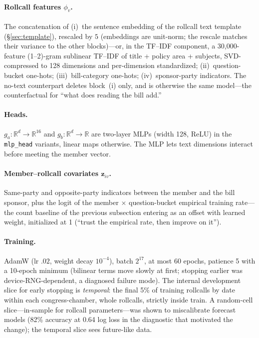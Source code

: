 \documentclass[11pt]{article}
\newcommand{\code}[1]{\texttt{#1}}
\begin{document}
\paragraph{Rollcall features $\phi_v$.} The concatenation of
(i)~the sentence embedding of the rollcall text template
(\S\ref{sec:template}), rescaled by $5$ (embeddings are unit-norm; the
rescale matches their variance to the other blocks)---or, in the
TF--IDF component, a 30{,}000-feature (1--2)-gram sublinear TF--IDF of
title + policy area + subjects, SVD-compressed to 128 dimensions and
per-dimension standardized; (ii)~question-bucket one-hots;
(iii)~bill-category one-hots; (iv)~sponsor-party indicators. The
no-text counterpart deletes block~(i) only, and is otherwise the same
model---the counterfactual for ``what does reading the bill add.''

\paragraph{Heads.} $g_a: \mathbb{R}^d \to \mathbb{R}^{16}$ and
$g_b: \mathbb{R}^d \to \mathbb{R}$ are two-layer MLPs (width 128, ReLU)
in the \code{mlp\_head} variants, linear maps otherwise. The MLP lets
text dimensions interact before meeting the member vector.

\paragraph{Member--rollcall covariates $\mathbf{z}_{iv}$.} Same-party
and opposite-party indicators between the member and the bill sponsor,
plus the logit of the member $\times$ question-bucket empirical
training rate---the count baseline of the previous subsection entering
as an offset with learned weight, initialized at 1 (``trust the
empirical rate, then improve on it'').

\paragraph{Training.} AdamW (lr $.02$, weight decay $10^{-4}$), batch
$2^{17}$, at most 60 epochs, patience 5 with a 10-epoch minimum
(bilinear terms move slowly at first; stopping earlier was
device-RNG-dependent, a diagnosed failure mode). The internal
development slice for early stopping is \emph{temporal}: the final 5\%
of training rollcalls by date within each congress-chamber, whole
rollcalls, strictly inside train. A random-cell slice---in-sample for
rollcall parameters---was shown to miscalibrate forecast models (82\%
accuracy at 0.64 log loss in the diagnostic that motivated the change);
the temporal slice sees future-like data.
\end{document}
